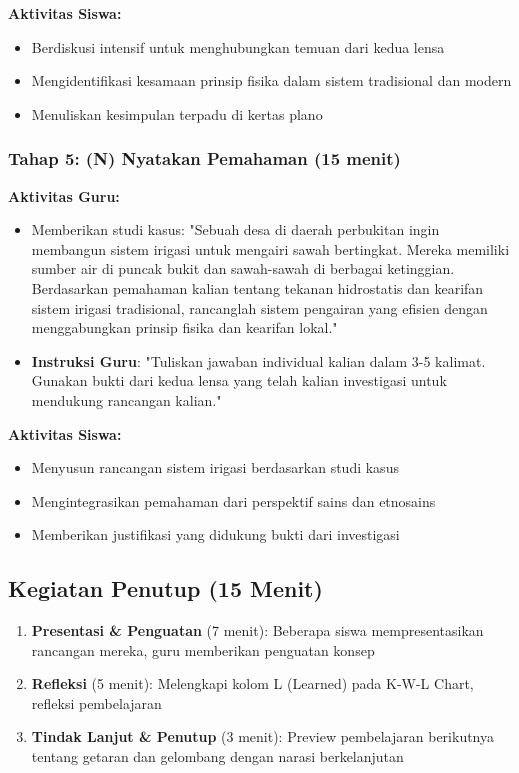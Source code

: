 \documentclass[12pt,a4paper]{article}
\begin{document}
\textbf{Aktivitas Siswa:}
\begin{itemize}
\item Berdiskusi intensif untuk menghubungkan temuan dari kedua lensa
\item Mengidentifikasi kesamaan prinsip fisika dalam sistem tradisional dan modern
\item Menuliskan kesimpulan terpadu di kertas plano
\end{itemize}

\subsubsection{Tahap 5: (N) Nyatakan Pemahaman (15 menit)}

\textbf{Aktivitas Guru:}
\begin{itemize}
\item Memberikan studi kasus: "Sebuah desa di daerah perbukitan ingin membangun sistem irigasi untuk mengairi sawah bertingkat. Mereka memiliki sumber air di puncak bukit dan sawah-sawah di berbagai ketinggian. Berdasarkan pemahaman kalian tentang tekanan hidrostatis dan kearifan sistem irigasi tradisional, rancanglah sistem pengairan yang efisien dengan menggabungkan prinsip fisika dan kearifan lokal."
\item \textbf{Instruksi Guru}: "Tuliskan jawaban individual kalian dalam 3-5 kalimat. Gunakan bukti dari kedua lensa yang telah kalian investigasi untuk mendukung rancangan kalian."
\end{itemize}

\textbf{Aktivitas Siswa:}
\begin{itemize}
\item Menyusun rancangan sistem irigasi berdasarkan studi kasus
\item Mengintegrasikan pemahaman dari perspektif sains dan etnosains
\item Memberikan justifikasi yang didukung bukti dari investigasi
\end{itemize}

\subsection{Kegiatan Penutup (15 Menit)}

\begin{enumerate}
\item \textbf{Presentasi \& Penguatan} (7 menit): Beberapa siswa mempresentasikan rancangan mereka, guru memberikan penguatan konsep
\item \textbf{Refleksi} (5 menit): Melengkapi kolom L (Learned) pada K-W-L Chart, refleksi pembelajaran
\item \textbf{Tindak Lanjut \& Penutup} (3 menit): Preview pembelajaran berikutnya tentang getaran dan gelombang dengan narasi berkelanjutan
\end{enumerate}
\end{document}
